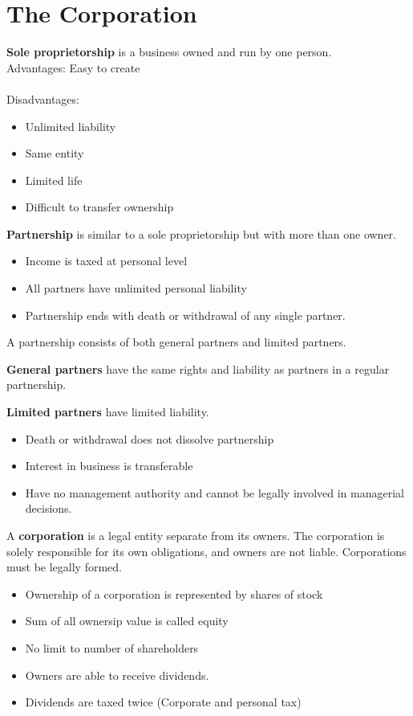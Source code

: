 \documentclass[english, 12pt]{article}
\begin{document}
\section{The Corporation}
\begin{defn}
\textbf{Sole proprietorship} is a business owned and run by one person.\\
Advantages: Easy to create\\\\
Disadvantages:
\begin{itemize}
\item Unlimited liability
\item Same entity
\item Limited life
\item Difficult to transfer ownership
\end{itemize}
\end{defn}
\begin{defn}
\textbf{Partnership} is similar to a sole proprietorship but with more than one owner.
\begin{itemize}
\item Income is taxed at personal level
\item All partners have unlimited personal liability
\item Partnership ends with death or withdrawal of any single partner.
\end{itemize}
\end{defn}
\begin{qte}
A partnership consists of both general partners and limited partners.
\end{qte}
\begin{defn}
\textbf{General partners} have the same rights and liability as partners in a regular partnership.
\end{defn}
\begin{defn}
\textbf{Limited partners} have limited liability.
\begin{itemize}
\item Death or withdrawal does not dissolve partnership
\item Interest in business is transferable
\item Have no management authority and cannot be legally involved in managerial decisions.
\end{itemize}
\end{defn}
\begin{defn}
A \textbf{corporation} is a legal entity separate from its owners. The corporation is solely responsible for its own obligations, and owners are not liable. Corporations must be legally formed. 
\begin{itemize}
\item Ownership of a corporation is represented by shares of stock
\item Sum of all ownersip value is called equity
\item No limit to number of shareholders
\item Owners are able to receive dividends.
\item Dividends are taxed twice (Corporate and personal tax)
\end{itemize}
\end{defn}
\end{document}
